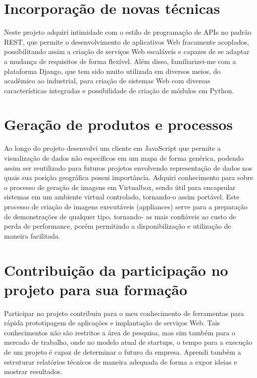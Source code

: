 \documentclass[%
        TwoSidePages,%
        Portuguese,%
        TablesPage,%
        FiguresPage,%
        ]
{ic-tese-v2}
\begin{document}
\section{Incorporação de novas técnicas}
Neste projeto adquiri intimidade com o estilo de programação de APIs no padrão REST, que permite o desenvolvimento de aplicativos Web fracamente acoplados, possibilitando assim a criação de serviços Web escaláveis e capazes de se adaptar a mudança de requisitos de forma flexível. Além disso, familiarizei-me com a plataforma Django, que tem sido muito utilizada em diversos meios, do acadêmico ao industrial, para criação de sistemas Web com diversas características integradas e possibilidade de criação de módulos em Python.
\section{Geração de produtos e processos}
Ao longo do projeto desenvolvi um cliente em JavaScript que permite a visualização de dados não específicos em um mapa de forma genérica, podendo assim ser reutilizado para futuros projetos envolvendo representação de dados nos quais sua posição geográfica possui importância.
Adquiri conhecimento para sobre o processo de geração de imagens em Virtualbox, sendo útil para encapsular sistemas em um ambiente virtual controlado, tornando-o assim portável. Este processo de criação de imagens executáveis (appliances) serve para a preparação de demonstrações de qualquer tipo, tornando- as mais confiáveis ao custo de perda de performance, porém permitindo a disponibilização e utilização de maneira facilitada.
\section{Contribuição da participação no projeto para sua formação}
Participar no projeto contribuiu para o meu conhecimento de ferramentas para rápida prototipagem de aplicações e implantação de serviços Web. Tais conhecimentos não são restritos a área de pesquisa, mas sim também para o mercado de trabalho, onde no modelo atual de startups, o tempo para a execução de um projeto é capaz de determinar o futuro da empresa. Aprendi também a estruturar relatórios técnicos de maneira adequada de forma a expor ideias e mostrar resultados.
\end{document}

